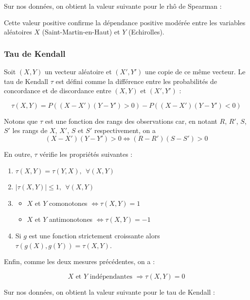 Sur nos données, on obtient la valeur suivante pour le rhô de Spearman :

\begin{center}
\end{center}

Cette valeur positive confirme la dépendance positive modérée entre les variables aléatoires $X$ (Saint-Martin-en-Haut) et $Y$ (Echirolles).

\subsubsection{Tau de Kendall}

Soit $(X,Y)$ un vecteur aléatoire et $(X',Y')$ une copie de ce même vecteur. Le tau de Kendall $\tau$ est défini
comme la différence  entre les probabilités de concordance et de discordance entre $(X,Y)$ et $(X',Y')$ :

$$
\tau(X,Y) = P\left( (X-X')(Y-Y') >0 \right) - P\left( (X-X')(Y-Y') <0 \right)
$$

Notons que $\tau$ est une fonction des rangs des observations car, en notant $R$, $R'$, $S$, $S'$ les rangs de $X$, $X'$, $S$ et $S'$ respectivement, on a 
$$
(X-X')(Y-Y') >0 \Longleftrightarrow (R-R')(S-S') >0 
$$

En outre, $\tau$ vérifie les propriétés suivantes :

\begin{enumerate}

\item $\tau(X,Y) = \tau(Y,X), ~~\forall (X,Y)$
\item $|\tau(X,Y)| \leq 1, ~~\forall (X,Y)$
\item 
\begin{itemize}
\item $X$ et $Y$ comonotones $\Longleftrightarrow \tau(X,Y)=1$
\item $X$ et $Y$ antimonotones $\Longleftrightarrow \tau(X,Y)=-1$
\end{itemize}
\item Si $g$ est une fonction strictement croissante alors $\tau(g(X),g(Y))=\tau(X,Y)$.
\end{enumerate}

Enfin, comme les deux mesures précédentes, on a :

$$
X \text{~et~} Y \text{~indépendantes~} \Longrightarrow \tau(X,Y) = 0
$$

Sur nos données, on obtient la valeur suivante pour le tau de Kendall :

